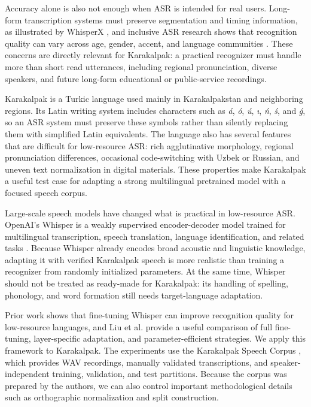\documentclass[11pt]{article}
\begin{document}
Accuracy alone is also not enough when ASR is intended for real users. Long-form transcription systems must preserve segmentation and timing information, as illustrated by WhisperX \cite{bain2023whisperx}, and inclusive ASR research shows that recognition quality can vary across age, gender, accent, and language communities \cite{feng2024inclusive}. These concerns are directly relevant for Karakalpak: a practical recognizer must handle more than short read utterances, including regional pronunciation, diverse speakers, and future long-form educational or public-service recordings.

Karakalpak is a Turkic language used mainly in Karakalpakstan and neighboring regions. Its Latin writing system includes characters such as \textit{á}, \textit{ó}, \textit{ú}, \textit{ı}, \textit{ń}, \textit{ś}, and \textit{ǵ}, so an ASR system must preserve these symbols rather than silently replacing them with simplified Latin equivalents. The language also has several features that are difficult for low-resource ASR: rich agglutinative morphology, regional pronunciation differences, occasional code-switching with Uzbek or Russian, and uneven text normalization in digital materials. These properties make Karakalpak a useful test case for adapting a strong multilingual pretrained model with a focused speech corpus.

Large-scale speech models have changed what is practical in low-resource ASR. OpenAI's Whisper is a weakly supervised encoder-decoder model trained for multilingual transcription, speech translation, language identification, and related tasks \cite{radford2023robust}. Because Whisper already encodes broad acoustic and linguistic knowledge, adapting it with verified Karakalpak speech is more realistic than training a recognizer from randomly initialized parameters. At the same time, Whisper should not be treated as ready-made for Karakalpak: its handling of spelling, phonology, and word formation still needs target-language adaptation.

Prior work shows that fine-tuning Whisper can improve recognition quality for low-resource languages, and Liu et al. \cite{liu2024exploration} provide a useful comparison of full fine-tuning, layer-specific adaptation, and parameter-efficient strategies. We apply this framework to Karakalpak. The experiments use the Karakalpak Speech Corpus \cite{uteuliev2026karakalpak}, which provides WAV recordings, manually validated transcriptions, and speaker-independent training, validation, and test partitions. Because the corpus was prepared by the authors, we can also control important methodological details such as orthographic normalization and split construction.
\end{document}
